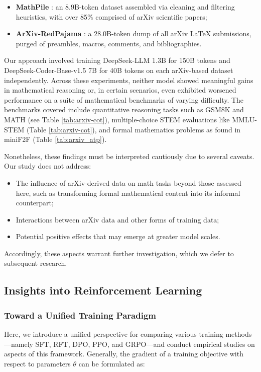 \begin{itemize}[topsep=0pt]
\begin{itemize}[topsep=0pt]
    \item \textbf{MathPile} \citep{mathpile}: an 8.9B-token dataset assembled via cleaning and filtering heuristics, with over 85\% comprised of arXiv scientific papers;
    \item \textbf{ArXiv-RedPajama} \citep{redpajama}: a 28.0B-token dump of all arXiv LaTeX submissions, purged of preambles, macros, comments, and bibliographies.
\end{itemize}

Our approach involved training DeepSeek-LLM 1.3B for 150B tokens and DeepSeek-Coder-Base-v1.5 7B for 40B tokens on each arXiv-based dataset independently. Across these experiments, neither model showed meaningful gains in mathematical reasoning or, in certain scenarios, even exhibited worsened performance on a suite of mathematical benchmarks of varying difficulty. The benchmarks covered include quantitative reasoning tasks such as GSM8K and MATH (see Table \ref{tab:arxiv-cot}), multiple-choice STEM evaluations like MMLU-STEM (Table \ref{tab:arxiv-cot}), and formal mathematics problems as found in miniF2F (Table \ref{tab:arxiv_atp}).

Nonetheless, these findings must be interpreted cautiously due to several caveats. Our study does not address:

\begin{itemize}[topsep=0pt]
    \item The influence of arXiv-derived data on math tasks beyond those assessed here, such as transforming formal mathematical content into its informal counterpart;
    \item Interactions between arXiv data and other forms of training data;
    \item Potential positive effects that may emerge at greater model scales.
\end{itemize}

Accordingly, these aspects warrant further investigation, which we defer to subsequent research.

\subsection{Insights into Reinforcement Learning}
\subsubsection{Toward a Unified Training Paradigm} Here, we introduce a unified perspective for comparing various training methods—namely SFT, RFT, DPO, PPO, and GRPO—and conduct empirical studies on aspects of this framework. Generally, the gradient of a training objective with respect to parameters $\theta$ can be formulated as:


\end{itemize}
